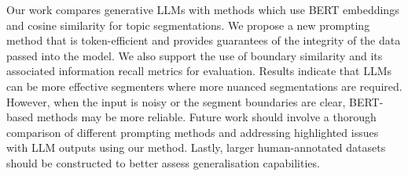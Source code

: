 
Our work compares generative LLMs with methods which use BERT embeddings and cosine similarity for topic segmentations. We propose a new prompting method that is token-efficient and provides guarantees of the integrity of the data passed into the model. We also support the use of boundary similarity and its associated information recall metrics for evaluation. Results indicate that LLMs can be more effective segmenters where more nuanced segmentations are required. However, when the input is noisy or the segment boundaries are clear, BERT-based methods may be more reliable. Future work should involve a thorough comparison of different prompting methods and addressing highlighted issues with LLM outputs using our method. Lastly, larger human-annotated datasets should be constructed to better assess generalisation capabilities.